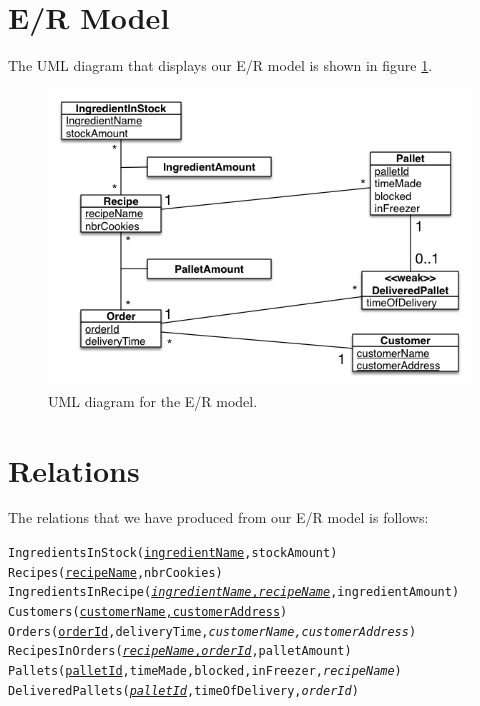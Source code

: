 \documentclass[a4paper]{article}
\begin{document}
\section{E/R Model}
The UML diagram that displays our E/R model is shown in figure \ref{uml}.

\begin{figure}[t]
\centering
\includegraphics[scale=0.7]{projectUMLFinal.png}
\caption{UML diagram for the E/R model.}
\label{uml}
\end{figure}

\section{Relations}
The relations that we have produced from our E/R model is follows:

\vspace{0.5cm}

\noindent \texttt{IngredientsInStock(\underline{ingredientName},stockAmount)} \\
\texttt{Recipes(\underline{recipeName},nbrCookies)} \\
\texttt{IngredientsInRecipe(\underline{\textit{ingredientName},\textit{recipeName}},ingredientAmount)} \\
\texttt{Customers(\underline{customerName,customerAddress})} \\
\texttt{Orders(\underline{orderId},deliveryTime,\textit{customerName,customerAddress})} \\
\texttt{RecipesInOrders(\underline{\textit{recipeName},\textit{orderId}},palletAmount)} \\
\texttt{Pallets(\underline{palletId},timeMade,blocked,inFreezer,\textit{recipeName})} \\
\texttt{DeliveredPallets(\underline{\textit{palletId}},timeOfDelivery,\textit{orderId})}
\end{document}

